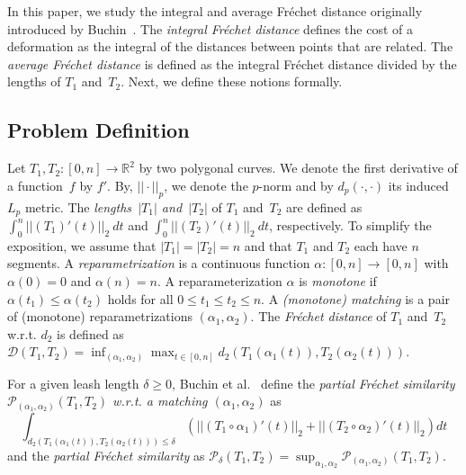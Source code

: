 \documentclass[a4paper,11pt]{article}
\begin{document}
	In this paper, we study the integral and average Fr\'{e}chet distance originally introduced by Buchin~\cite{buchin:phd}. The \emph{integral Fr\'{e}chet distance} defines the cost of a deformation as the integral of the distances between points that are related. The \emph{average Fr\'{e}chet distance} is defined as the integral Fr\'{e}chet distance divided by the lengths of $T_1$ and~$T_2$. Next, we define these notions formally.
\subsection{Problem Definition} 
	Let $T_1,T_2: [0,n] \rightarrow \mathbb{R}^2$ by two polygonal curves. We denote the first derivative of a function~$f$ by $f'$. By, $|| \cdot ||_p$, we denote the $p$-norm and by $d_p( \cdot, \cdot)$ its induced $L_p$ metric. The \emph{lengths~$|T_1|$ and~$|T_2|$} of $T_1$ and~$T_2$ are defined as $\int^n_0 ||(T_1)'(t)||_2\ dt$ and $\int^n_0 ||(T_2)'(t)||_2\ dt$, respectively.  To simplify the exposition, we assume that $|T_1| = |T_2| = n$ and that $T_1$ and $T_2$ each have $n$ segments. A \emph{reparametrization} is a continuous function $\alpha: [0,n] \rightarrow [0,n]$ with $\alpha(0) = 0$ and $\alpha(n)= n$. A reparameterization $\alpha$ is \emph{monotone} if $\alpha(t_1) \leq \alpha(t_2)$ holds for all $0 \leq t_1 \leq t_2 \leq n$. A \emph{(monotone) matching} is a pair of (monotone) reparametrizations $(\alpha_1,\alpha_2)$. The \emph{Fr\'echet distance} of $T_1$ and~$T_2$ w.r.t. $d_2$ is defined as $\mathscr{D} \left( T_1, T_2 \right)=\inf_{(\alpha_1,\alpha_2)} \max_{t \in [0,n]} d_2 (T_1(\alpha_1(t)), T_2(\alpha_2(t)))$.
	
	For a given leash length $\delta \geq 0$, Buchin et al.~\cite{buchin:exact} define the \emph{partial Fr\'{e}chet similarity $\mathcal{P}_{(\alpha_1,\alpha_2)}(T_1,T_2)$ w.r.t. a matching $(\alpha_1,\alpha_2)$} as
	 	\begin{equation*}
			\int_{d_2( T_1 \left( \alpha_1 \left( t \right) \right), T_2 \left( \alpha_2 \left( t \right) \right)  ) \leq \delta}   \left( || \left( T_1 \circ \alpha_1 \right)' \left( t \right)||_2 + || \left( T_2 \circ \alpha_2 \right)' \left( t \right)||_2 \right) dt
		\end{equation*}
	and the \emph{partial Fr\'{e}chet similarity} as $\mathcal{P}_{\delta}(T_1,T_2)=\sup_{\alpha_1,\alpha_2} \mathcal{P}_{(\alpha_1,\alpha_2)} (T_1,T_2)$.
		
\end{document}

